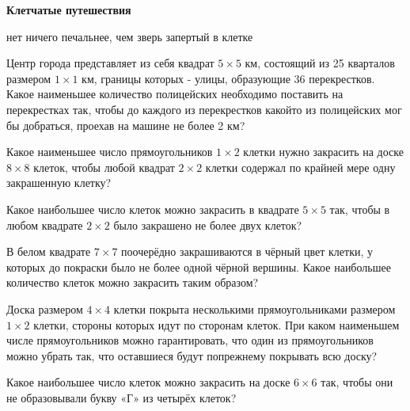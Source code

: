 \centerline{\bf \Huge Клетчатые путешествия}

\begin{flushright}
        \scriptsize{нет ничего печальнее, чем зверь запертый в клетке}
\end{flushright}

Центр города представляет из себя квадрат $5 \times 5$ км, состоящий из 25 кварталов размером $1 \times 1$ км, границы которых - улицы, образующие 36 перекрестков. Какое наименьшее количество полицейских необходимо поставить на перекрестках так, чтобы до каждого из перекрестков какойто из полицейских мог бы добраться, проехав на машине не более 2 км?

Какое наименьшее число прямоугольников $1 \times 2$ клетки нужно закрасить на доске $8 \times 8$ клеток, чтобы любой квадрат $2 \times 2$ клетки содержал по крайней мере одну закрашенную клетку?

Какое наибольшее число клеток можно закрасить в квадрате $5 \times 5$ так, чтобы в любом квадрате $2 \times 2$ было закрашено не более двух клеток?


В белом квадрате $7 \times 7$ поочерёдно закрашиваются в чёрный цвет клетки, у которых до покраски было не более одной чёрной вершины. Какое наибольшее количество клеток можно закрасить таким образом?

Доска размером $4 \times 4$ клетки покрыта несколькими прямоугольниками размером $1 \times 2$ клетки, стороны которых идут по сторонам клеток. При каком наименьшем числе прямоугольников можно гарантировать, что один из прямоугольников можно убрать так, что оставшиеся будут попрежнему покрывать всю доску?

Какое наибольшее число клеток можно закрасить на доске $6 \times 6$ так, чтобы они не образовывали букву «Г» из четырёх клеток?